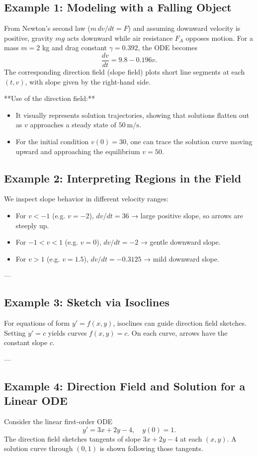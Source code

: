 \documentclass[12pt]{book}
\begin{document}
\subsection*{Example 1: Modeling with a Falling Object}
From Newton’s second law (\(m \, dv/dt = F\)) and assuming downward velocity is positive, gravity \(mg\) acts downward while air resistance \(F_A\) opposes motion. For a mass \(m = 2\) kg and drag constant \(\gamma = 0.392\), the ODE becomes
\[
\frac{dv}{dt} = 9.8 - 0.196v.
\]
The corresponding direction field (slope field) plots short line segments at each \((t, v)\), with slope given by the right-hand side.

**Use of the direction field:**
\begin{itemize}
  \item It visually represents solution trajectories, showing that solutions flatten out as \(v\) approaches a steady state of \(50\ \mathrm{m}/\mathrm{s}\).
  \item For the initial condition \(v(0) = 30\), one can trace the solution curve moving upward and approaching the equilibrium \(v = 50\).
\end{itemize}

\subsection*{Example 2: Interpreting Regions in the Field}
We inspect slope behavior in different velocity ranges:
\begin{itemize}
  \item For \(v < -1\) (e.g. \(v = -2\)), \(dv/dt = 36\) → large positive slope, so arrows are steeply up.
  \item For \(-1 < v < 1\) (e.g. \(v = 0\)), \(dv/dt = -2\) → gentle downward slope.
  \item For \(v > 1\) (e.g. \(v = 1.5\)), \(dv/dt = -0.3125\) → mild downward slope.
\end{itemize}

---

\subsection*{Example 3: Sketch via Isoclines}
For equations of form \(y' = f(x,y)\), isoclines can guide direction field sketches. Setting \(y' = c\) yields curves \(f(x,y)=c\). On each curve, arrows have the constant slope \(c\).

---

\subsection*{Example 4: Direction Field and Solution for a Linear ODE}
Consider the linear first-order ODE
\[
y' = 3x + 2y - 4,\quad y(0) = 1.
\]
The direction field sketches tangents of slope \(3x + 2y - 4\) at each \((x,y)\). A solution curve through \((0,1)\) is shown following those tangents.
\end{document}
